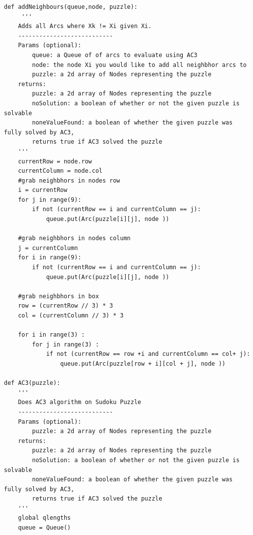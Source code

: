 \documentclass{article}
\begin{document}
\begin{verbatim}
def addNeighbours(queue,node, puzzle):
     '''
    Adds all Arcs where Xk != Xi given Xi. 
    ---------------------------
    Params (optional):
        queue: a Queue of of arcs to evaluate using AC3
        node: the node Xi you would like to add all neighbhor arcs to
        puzzle: a 2d array of Nodes representing the puzzle
    returns:
        puzzle: a 2d array of Nodes representing the puzzle
        noSolution: a boolean of whether or not the given puzzle is solvable
        noneValueFound: a boolean of whether the given puzzle was fully solved by AC3, 
        returns true if AC3 solved the puzzle
    '''
    currentRow = node.row
    currentColumn = node.col
    #grab neighbhors in nodes row
    i = currentRow
    for j in range(9): 
        if not (currentRow == i and currentColumn == j):
            queue.put(Arc(puzzle[i][j], node ))

    #grab neighbhors in nodes column
    j = currentColumn
    for i in range(9): 
        if not (currentRow == i and currentColumn == j):
            queue.put(Arc(puzzle[i][j], node ))

    #grab neighbhors in box
    row = (currentRow // 3) * 3
    col = (currentColumn // 3) * 3

    for i in range(3) :
        for j in range(3) :
            if not (currentRow == row +i and currentColumn == col+ j):
                queue.put(Arc(puzzle[row + i][col + j], node ))

def AC3(puzzle): 
    '''
    Does AC3 algorithm on Sudoku Puzzle
    ---------------------------
    Params (optional):
        puzzle: a 2d array of Nodes representing the puzzle
    returns:
        puzzle: a 2d array of Nodes representing the puzzle
        noSolution: a boolean of whether or not the given puzzle is solvable
        noneValueFound: a boolean of whether the given puzzle was fully solved by AC3,
        returns true if AC3 solved the puzzle
    '''
    global qlengths
    queue = Queue()
\end{verbatim}
\newpage
\end{document}
